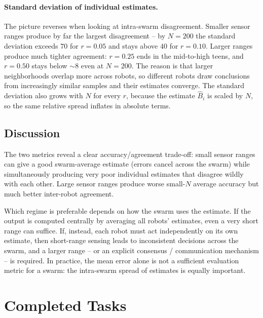 \documentclass[12pt, a4paper]{article}
\begin{document}
\paragraph{Standard deviation of individual estimates.}
The picture reverses when looking at intra-swarm disagreement.  Smaller
sensor ranges produce by far the largest disagreement -- by $N = 200$ the
standard deviation exceeds $70$ for $r = 0.05$ and stays above $40$ for
$r = 0.10$.  Larger ranges produce much tighter agreement: $r = 0.25$ ends
in the mid-to-high teens, and $r = 0.50$ stays below ${\sim}8$ even at
$N = 200$.  The reason is that larger neighborhoods overlap more across
robots, so different robots draw conclusions from increasingly similar
samples and their estimates converge.  The standard deviation also grows
with $N$ for every $r$, because the estimate $\hat{B}_i$ is scaled by $N$,
so the same relative spread inflates in absolute terms.

\subsection{Discussion}

The two metrics reveal a clear accuracy/agreement trade-off: small
sensor ranges can give a good swarm-average estimate (errors cancel
across the swarm) while simultaneously producing very poor individual
estimates that disagree wildly with each other.  Large sensor ranges produce
worse small-$N$ average accuracy but much better inter-robot agreement.

Which regime is preferable depends on how the swarm uses the estimate.  If
the output is computed centrally by averaging all robots' estimates, even a
very short range can suffice.  If, instead, each robot must act
independently on its own estimate, then short-range sensing leads to
inconsistent decisions across the swarm, and a larger range -- or an
explicit consensus / communication mechanism -- is required.  In practice,
the mean error alone is not a sufficient evaluation metric for a swarm: the
intra-swarm spread of estimates is equally important.

\newpage
\section{Completed Tasks}
\end{document}
